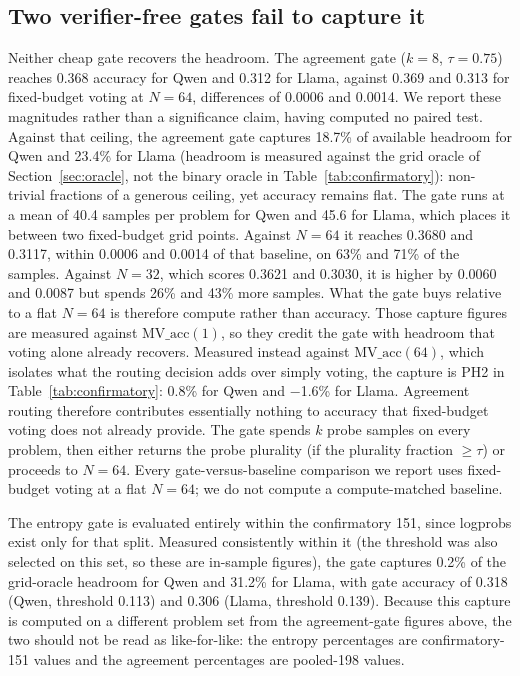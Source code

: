 \documentclass{article}
\begin{document}
\subsection{Two verifier-free gates fail to capture it}
\label{sec:gates}

Neither cheap gate recovers the headroom. The agreement gate ($k=8$,
$\tau=0.75$) reaches 0.368 accuracy for Qwen and 0.312 for Llama, against
0.369 and 0.313 for fixed-budget voting at $N=64$, differences of 0.0006 and
0.0014. We report these magnitudes rather than a significance claim, having
computed no paired test. Against that ceiling, the agreement gate captures
18.7\%
of available headroom for Qwen and 23.4\% for Llama (headroom is measured
against the grid oracle of Section~\ref{sec:oracle}, not the binary oracle in
Table~\ref{tab:confirmatory}): non-trivial fractions of a generous ceiling,
yet accuracy remains flat. The gate runs at a mean of 40.4 samples per problem
for Qwen and 45.6 for Llama, which places it between two fixed-budget grid
points. Against $N=64$ it reaches 0.3680 and 0.3117, within 0.0006 and 0.0014
of that baseline, on 63\% and 71\% of the samples. Against $N=32$, which scores
0.3621 and 0.3030, it is higher by 0.0060 and 0.0087 but spends 26\% and 43\%
more samples. What the gate buys relative to a flat $N=64$ is therefore compute
rather than accuracy. Those capture figures are measured against
$\text{MV\_acc}(1)$, so they credit the gate with headroom that voting alone
already recovers. Measured instead against $\text{MV\_acc}(64)$, which isolates
what the routing decision adds over simply voting, the capture is PH2 in
Table~\ref{tab:confirmatory}: 0.8\% for Qwen and $-$1.6\% for Llama.
Agreement routing therefore contributes essentially nothing to accuracy that
fixed-budget voting does not already provide. The gate spends $k$ probe
samples on every problem, then either returns the probe plurality (if the
plurality fraction $\geq \tau$) or proceeds to $N=64$. Every gate-versus-baseline
comparison we report uses fixed-budget voting at a flat $N=64$; we do not
compute a compute-matched baseline.

The entropy gate is evaluated entirely within the confirmatory 151, since
logprobs exist only for that split. Measured
consistently within it (the threshold was also selected on this set, so these
are in-sample figures), the gate captures 0.2\% of the grid-oracle headroom
for Qwen and 31.2\% for Llama, with gate accuracy of 0.318 (Qwen, threshold
0.113) and 0.306 (Llama, threshold 0.139). Because this capture is computed
on a different problem set from the agreement-gate figures above, the two
should not be read as like-for-like: the entropy percentages are
confirmatory-151 values and the agreement percentages are pooled-198 values.
\end{document}
